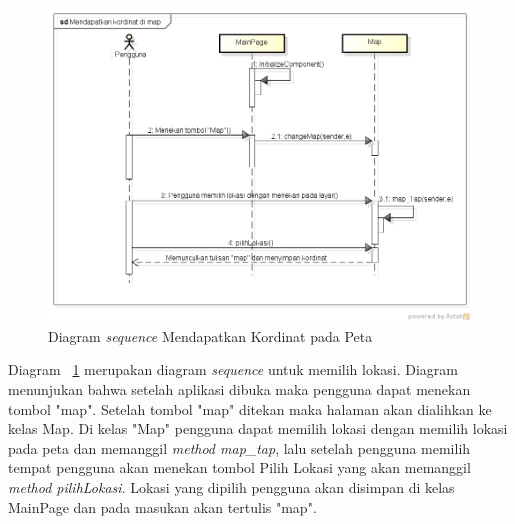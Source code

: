 \begin{figure}[h]
	\centering
		\includegraphics[scale=0.4]{Gambar/sequence/MendapatkanKordinatDiMap}
	\caption{Diagram \textit{sequence} Mendapatkan Kordinat pada Peta}
	\label{fig:sequence lokasi pada peta}
\end{figure}

\hspace{0.5cm} Diagram ~\ref{fig:sequence lokasi pada peta} merupakan diagram \textit{sequence} untuk memilih lokasi. Diagram menunjukan bahwa setelah aplikasi dibuka maka pengguna dapat menekan tombol "map". Setelah tombol "map" ditekan maka halaman akan dialihkan ke kelas Map. Di kelas "Map" pengguna dapat memilih lokasi dengan memilih lokasi pada peta dan memanggil \textit{method map\_tap}, lalu setelah pengguna memilih tempat pengguna akan menekan tombol Pilih Lokasi yang akan memanggil \textit{method pilihLokasi}. Lokasi yang dipilih pengguna akan disimpan di kelas MainPage dan pada masukan akan tertulis "map". 

